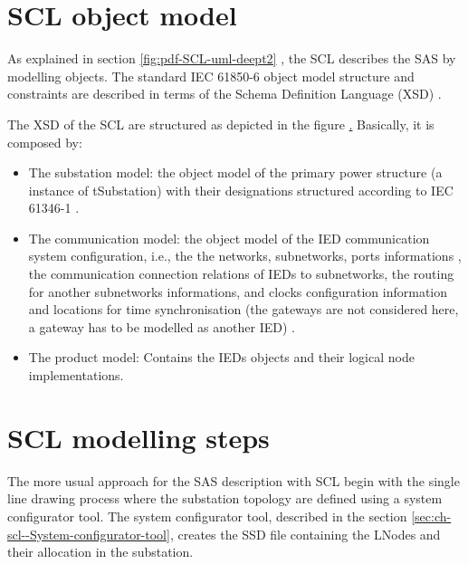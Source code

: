 \section{SCL object model}


As explained in section \ref{fig:pdf-SCL-uml-deept2} , 
the SCL describes the SAS by modelling objects.
The standard IEC 61850-6 \cite{IEC61850-6:2004} object model 
structure and constraints are described in terms of the 
Schema Definition Language (XSD) .

The XSD of the SCL are structured as depicted 
in the figure \href{fig:pdf-SCL-uml-deept2}. 
Basically, it is composed by: 

\begin{itemize}
  \item The substation model: the object model of the primary power structure
  		(a instance of tSubstation) with their designations structured according to 
  		IEC 61346-1 \cite{IEC61346-1:1996}. 
  \item The communication model: the object model of the IED 
  		communication system configuration, 
  		i.e.,
  		the the networks, subnetworks, ports informations
  		,
  		the communication connection relations of IEDs to 
  		subnetworks, the routing for another subnetworks informations, 
  		and clocks configuration information and locations for 
  		time synchronisation (the gateways are not considered here, 
  		a gateway has to be modelled as another IED)
  		.
  \item The product model: Contains the IEDs objects and their 
  		logical node implementations. 	
\end{itemize}

\section{SCL modelling steps}
The more usual approach for the \gls{SAS} description 
with \gls{SCL} begin with the 
single line drawing process where the 
substation topology are defined using a 
system configurator tool. The system configurator tool, 
described in the section \ref{sec:ch-scl--System-configurator-tool}, 
creates the \gls{SSD} file containing the \gls{LNodes}
and their allocation in the substation.

